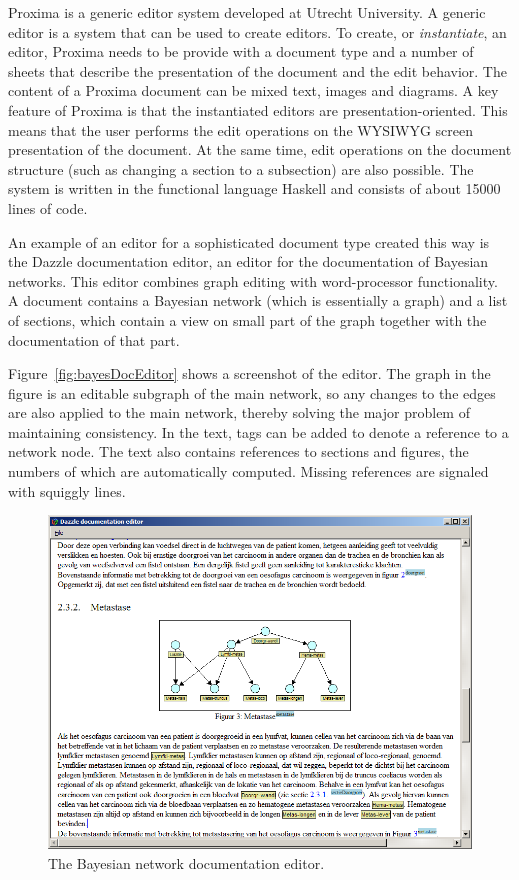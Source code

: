 \documentclass[10pt]{article}
\begin{document}
Proxima is a generic editor system developed at Utrecht University. A generic editor is a system that can be used to create editors. To create, or {\em instantiate}, an editor, Proxima needs to be provide with a document type and a number of sheets that describe the presentation of the document and the edit behavior. The content of a Proxima document can be mixed text, images and diagrams. A key feature of Proxima is that the instantiated editors are presentation-oriented. This means that the user performs the edit operations on the WYSIWYG screen presentation of the document. At the same time, edit operations on the document structure (such as changing a section to a subsection) are also possible. The system is written in the functional language Haskell and consists of about 15000 lines of code.

An example of an editor for a sophisticated document type created this way is the Dazzle documentation editor, an editor for the documentation of Bayesian networks. This editor combines graph editing with word-processor functionality. A document contains a Bayesian network (which is essentially a graph) and a list of sections, which contain a view on small part of the graph together with the documentation of that part. 

Figure~\ref{fig:bayesDocEditor} shows a screenshot of the editor. The graph in the figure is an editable subgraph of the main network, so any changes to the edges are also applied to the main network, thereby solving the major problem of maintaining consistency. In the text, tags can be added to denote a reference to a network node. The text also contains references to sections and figures, the numbers of which are automatically computed. Missing references are signaled with squiggly lines.

\begin{figure}
\includegraphics[width=12cm]{images/subgraph}
\caption{The Bayesian network documentation editor.}
\label{fig:levelsAndLayers}
\end{figure}
\end{document}

